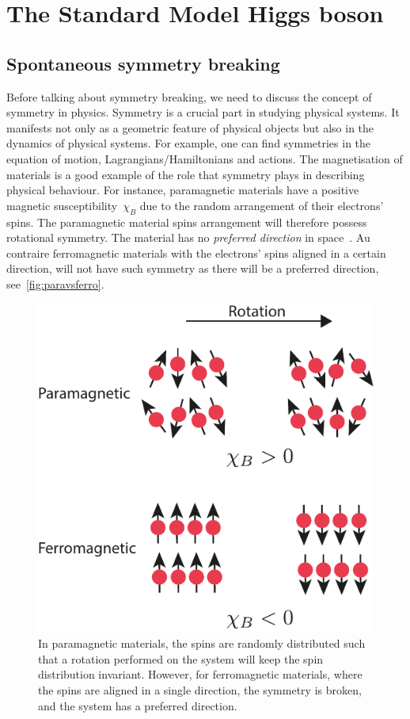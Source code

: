 \chapter{The Standard Model Higgs boson }\label{chap:HiggsSM}

\section{Spontaneous symmetry breaking \label{sec:ssb}}
\par Before talking about symmetry breaking, we need to discuss the concept of symmetry in physics. Symmetry is a crucial part in studying physical systems. It manifests not only as a geometric feature of physical objects but also in the dynamics of physical systems. For example, one can find symmetries in the equation of motion, Lagrangians/Hamiltonians and actions. The magnetisation of materials is a good example of the role that symmetry plays in describing physical behaviour. For instance, {paramagnetic} materials have a positive magnetic susceptibility~$\chi_B$ due to the random arrangement of their electrons' spins.  The paramagnetic material spins arrangement will therefore possess rotational symmetry. The material has no \textit{ preferred direction} in space~\cite{minlos2000introduction}. Au contraire {ferromagnetic} materials with the electrons' spins aligned in a certain direction, will not have such symmetry as there will be a preferred direction, see~\autoref{fig:paravsferro}. 
\begin{figure}[htpb!]
    \centering  
   \includegraphics[width=0.36\linewidth]{./figures/ferrvspara}
    \caption{In paramagnetic materials, the spins are randomly distributed such that a rotation performed on the system will keep the spin distribution invariant. However, for ferromagnetic materials, where the spins are aligned in a single direction, the symmetry is broken, and the system has a preferred direction.}  \label{fig:paravsferro}
\end{figure}

